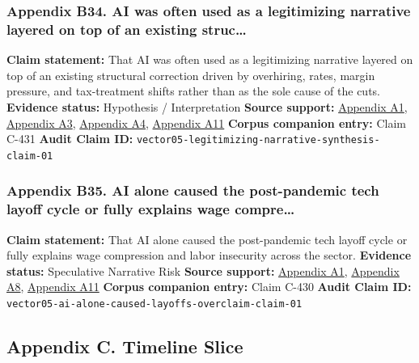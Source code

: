 \documentclass[
  american,
  11pt,
  letterpaper,
]{article}
\begin{document}
\subsubsection{Appendix B34. AI was often used as a legitimizing
narrative layered on top of an existing
struc\ldots{}}\label{ch-05-appendix-b34-ai-was-often-used-as-a-legitimizing-narrative-layered-on-top-of-an-existing-struc}

\textbf{Claim statement:} That AI was often used as a legitimizing
narrative layered on top of an existing structural correction driven by
overhiring, rates, margin pressure, and tax-treatment shifts rather than
as the sole cause of the cuts. \textbf{Evidence status:} Hypothesis /
Interpretation \textbf{Source support:}
\hyperref[ch-05-appendix-a1-notice-2023-63-guidance-on-section-174-and-specified-research-or-experimental-expenditures]{Appendix
A1},
\hyperref[ch-05-appendix-a3-mark-zuckerberg-s-message-to-meta-employees]{Appendix
A3},
\hyperref[ch-05-appendix-a4-ai-exuberance-masks-broad-weakness-in-tech-sector-say-investors]{Appendix
A4}, \hyperref[ch-05-appendix-a11-annual-economic-report-2026]{Appendix
A11} \textbf{Corpus companion entry:} Claim C-431 \textbf{Audit Claim
ID:} \texttt{vector05-legitimizing-narrative-synthesis-claim-01}

\subsubsection{Appendix B35. AI alone caused the post-pandemic tech
layoff cycle or fully explains wage
compre\ldots{}}\label{ch-05-appendix-b35-ai-alone-caused-the-post-pandemic-tech-layoff-cycle-or-fully-explains-wage-compre}

\textbf{Claim statement:} That AI alone caused the post-pandemic tech
layoff cycle or fully explains wage compression and labor insecurity
across the sector. \textbf{Evidence status:} Speculative Narrative Risk
\textbf{Source support:}
\hyperref[ch-05-appendix-a1-notice-2023-63-guidance-on-section-174-and-specified-research-or-experimental-expenditures]{Appendix
A1},
\hyperref[ch-05-appendix-a8-meta-posts-lower-q4-profit-announces-huge-stock-buyback]{Appendix
A8}, \hyperref[ch-05-appendix-a11-annual-economic-report-2026]{Appendix
A11} \textbf{Corpus companion entry:} Claim C-430 \textbf{Audit Claim
ID:} \texttt{vector05-ai-alone-caused-layoffs-overclaim-claim-01}

\subsection{Appendix C. Timeline
Slice}\label{appendix-c.-timeline-slice-5}
\end{document}
